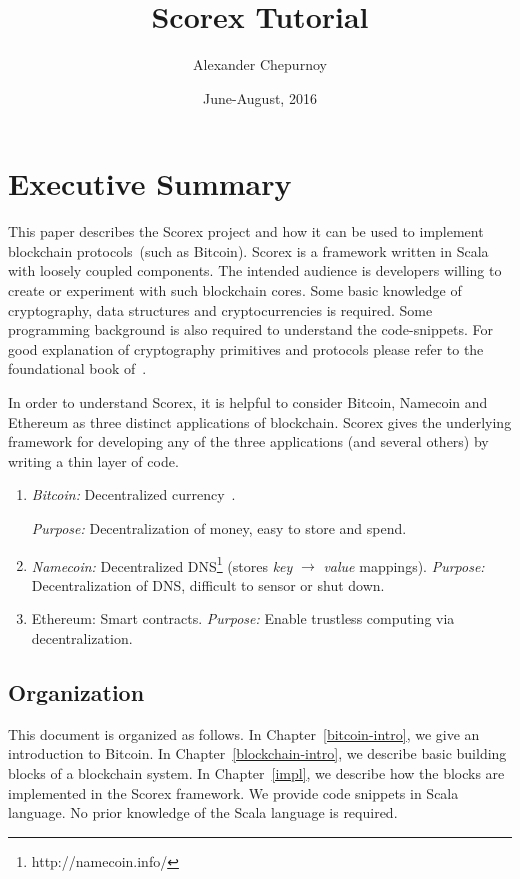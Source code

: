 \documentclass[]{report}   %
\begin{document}
\title{Scorex Tutorial}
\author{Alexander Chepurnoy}         
\date{June-August, 2016}
\maketitle

\chapter{Executive Summary}

This paper describes the Scorex project and how it can be used to implement blockchain protocols~(such as Bitcoin). Scorex is a framework written in Scala with loosely coupled components. 
The intended audience is developers willing to create or experiment with such blockchain cores. Some basic knowledge of cryptography, data structures and cryptocurrencies is required. Some programming background is also required to understand the code-snippets. For good explanation of cryptography primitives and protocols please refer to the foundational book of~\cite{katz2014introduction}. 

In order to understand Scorex, it is helpful to consider Bitcoin, Namecoin and Ethereum as three distinct applications of blockchain. Scorex gives the underlying framework for developing any of the three applications (and several others) by writing a thin layer of code. 

\begin{enumerate}
	\item {\em Bitcoin:} Decentralized currency~\cite{Nakamoto2008}.
	
		{\em Purpose:} Decentralization of money, easy to store and spend.		
	\item {\em Namecoin:} Decentralized DNS\footnote{http://namecoin.info/} (stores {\em key} $\rightarrow$ {\em value} mappings).
		{\em Purpose:} Decentralization of DNS, difficult to sensor or shut down.		
	\item {Ethereum:} Smart	contracts.	
	  {\em Purpose:} Enable trustless computing via decentralization.		
\end{enumerate}


\section{Organization}


This document is organized as follows. In Chapter~\ref{bitcoin-intro}, we give an introduction to Bitcoin. In Chapter~\ref{blockchain-intro}, we describe basic building blocks of a blockchain system. In Chapter~\ref{impl}, we describe how the blocks are implemented in the Scorex framework. We provide code snippets in Scala language. No prior knowledge of the Scala language is required.
\end{document}
